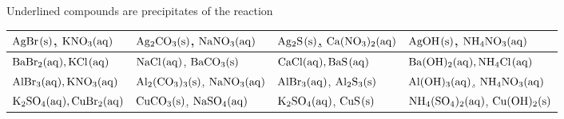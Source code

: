 \documentclass{scrartcl}
\begin{document}
Underlined compounds are precipitates of the reaction
\begin{center}
\begin{tabular}{llll}
\toprule
\uline{\(\ce{AgBr(s)}\),} \(\ce{KNO3(aq)}\) & \uline{\(\ce{Ag2CO3(s)}\)}, \(\ce{NaNO3(aq)}\) & \uline{\(\ce{Ag2S(s)}\),}  \(\ce{Ca(NO3)2(aq)}\) & \uline{\(\ce{AgOH(s)}\)}, \(\ce{NH4NO3(aq)}\)\\
\midrule
\(\ce{BaBr2(aq), KCl(aq)}\) & \(\ce{NaCl(aq)}\), \uline{\(\ce{BaCO3(s)}\)} & \(\ce{CaCl(aq), BaS(aq)}\) & \(\ce{Ba(OH)2(aq), NH4Cl(aq)}\)\\
\midrule
\(\ce{AlBr3(aq), KNO3(aq)}\) & \uline{\(\ce{Al2(CO3)3(s)}\),} \(\ce{NaNO3(aq)}\) & \(\ce{AlBr3(aq)}\), \uline{\(\ce{Al2S3(s)}\)} & \uline{\(\ce{Al(OH)3(aq)}\),} \(\ce{NH4NO3(aq)}\)\\
\midrule
\(\ce{K2SO4(aq), CuBr2(aq)}\) & \uline{\(\ce{CuCO3(s)}\),} \(\ce{NaSO4(aq)}\) & \(\ce{K2SO4(aq)}\), \uline{\(\ce{CuS(s)}\)} & \(\ce{NH4(SO4)2(aq)}\), \uline{\(\ce{Cu(OH)2(s)}\)}\\
\bottomrule
\end{tabular}
\end{center}
\end{document}
